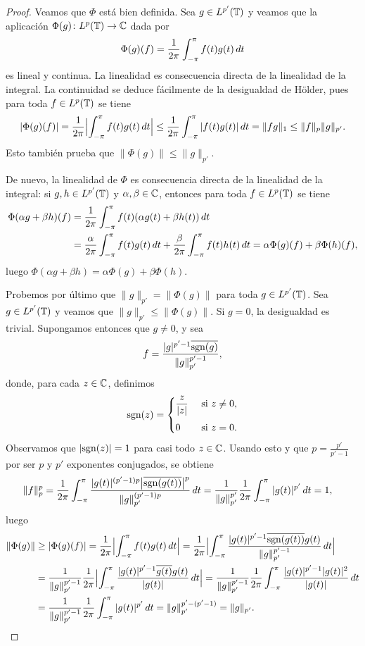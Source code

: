 \documentclass[a4paper, 12pt, oneside]{book}
\begin{document}
\begin{proof}
    Veamos que $\Phi$ está bien definida. Sea $g \in L^{p'}(\mathbb T)$ y veamos que la aplicación $\Phi(g)\colon L^p(\mathbb T)\to \mathbb C$ dada por
    \[\Phi(g)(f) = \frac{1}{2\pi}\int_{-\pi}^{\pi} f(t)g(t) \, dt\]
    es lineal y continua. La linealidad es consecuencia directa de la linealidad de la integral. La continuidad se deduce fácilmente de la desigualdad de Hölder, pues para toda $f \in L^p(\mathbb T)$ se tiene
    \[|\Phi(g)(f)| = \frac{1}{2\pi}\Bigl|\int_{-\pi}^{\pi} f(t)g(t) \, dt\Bigr| \leq \frac{1}{2\pi}\int_{-\pi}^{\pi} |f(t){g(t)}| \, dt = \|fg\|_1 \leq \|f\|_p\|g\|_{p'}.\]
    Esto también prueba que $\|\Phi(g)\| \leq \|g\|_{p'}$.
    
    De nuevo, la linealidad de $\Phi$ es consecuencia directa de la linealidad de la integral: si $g,h \in L^{p'}(\mathbb T)$ y $\alpha,\beta \in \mathbb C$, entonces para toda $f \in L^p(\mathbb T)$ se tiene
    \begin{align*}
        \Phi(\alpha g + \beta h)(f) &= \frac{1}{2\pi}\int_{-\pi}^{\pi} f(t)(\alpha g(t)+\beta h(t)) \, dt \\ &= \frac{\alpha}{2\pi}\int_{-\pi}^{\pi} f(t)g(t) \, dt+\frac{\beta}{2\pi}\int_{-\pi}^{\pi} f(t)h(t) \, dt = \alpha \Phi(g)(f)+\beta \Phi(h)(f),
    \end{align*}
    luego $\Phi(\alpha g + \beta h) = \alpha \Phi(g) + \beta \Phi(h)$.

    Probemos por último que $\|g\|_{p'} = \|\Phi(g)\|$ para toda $g \in L^{p'}(\mathbb T)$. Sea $g \in L^{p'}(\mathbb T)$ y veamos que $\|g\|_{p'} \leq \|\Phi(g)\|$. Si $g = 0$, la desigualdad es trivial. Supongamos entonces que $g \neq 0$, y sea
    \[f = \frac{|g|^{p'-1}\overline{\textup{sgn}(g)}}{\|g\|^{p'-1}_{p'}},\]
    donde, para cada $z \in \mathbb C$, definimos
    \[\sgn(z) = \begin{cases}
        \displaystyle \frac{z}{|z|} & $ si $ z \neq 0, \\[10pt]
        0 & $ si $ z = 0.
    \end{cases}\]
    Observamos que $|\textup{sgn}(z)| = 1$ para casi todo $z\in\mathbb C$. Usando esto y que $p = \frac{p'}{p'-1}$ por ser $p$ y $p'$ exponentes conjugados, se obtiene
    \[\begin{aligned}[t]
        \|f\|_p^p &= \frac{1}{2\pi}\int_{-\pi}^{\pi} \frac{|g(t)|^{(p'-1)p}\bigl|\overline{\textup{sgn} (g(t))}\bigr|^p}{\|g\|_{p'}^{(p'-1)p}} \, dt = \frac{1}{\|g\|_{p'}^{p'}}\frac{1}{2\pi}\int_{-\pi}^{\pi} |g(t)|^{p'} \, dt = 1,
    \end{aligned}\]
    luego
    \[\begin{aligned}[t]
        \|\Phi(g)\| &\geq |\Phi(g)(f)| = \frac{1}{2\pi}\Bigl|\int_{-\pi}^{\pi} f(t)g(t) \, dt\Bigr| = \frac{1}{2\pi}\Bigl|\int_{-\pi}^{\pi} \frac{|g(t)|^{p'-1}\overline{\textup{sgn}(g(t))}g(t)}{\|g\|_{p'}^{p'-1}} \, dt\Bigr| \\
        &= \frac{1}{\|g\|_{p'}^{p'-1}} \frac{1}{2\pi}\Bigl|\int_{-\pi}^{\pi} \frac{|g(t)|^{p'-1}\overline{g(t)}g(t)}{|g(t)|} \, dt\Bigr| = \frac{1}{\|g\|_{p'}^{p'-1}} \frac{1}{2\pi}\int_{-\pi}^{\pi} \frac{|g(t)|^{p'-1}|g(t)|^2}{|g(t)|} \, dt
        \\ &= \frac{1}{\|g\|_{p'}^{p'-1}} \frac{1}{2\pi}\int_{-\pi}^{\pi} |g(t)|^{p'} \, dt = \|g\|_{p'}^{p'-(p'-1)} = \|g\|_{p'}.
    \end{aligned}\]


\end{proof}
\end{document}
